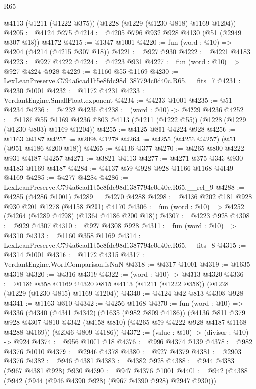 \begin{lexlean}{R65}
\begin{coremodule}
    @4113
    (@1211 (@1222 @375))
    (@1228 (@1229 (@1230 @818) @1169 @1204))
@4205 := @4124 @275
@4214 := @4205 @796 @932 @928 @4130 (@51 (@2949 @307 @18)) @4172
@4215 := @1347 @1001
@4220 := fun (word : @10) => @4204 (@4214 (@4215 @307 @18))
@4221 := @927 @930
@4222 := @4221 @4183
@4223 := @927 @4222
@4224 := @4223 @931
@4227 := fun (word : @10) => @927 @4224 @928
@4229 := @1160 @55 @1169
@4230 := LexLeanPreserve.C794a6cad1b5e8fdc98d1387794c0d40c.R65.__fits_7
@4231 := @4230 @1001
@4232 := @1172 @4231
@4233 := VerdantEngine.SmallFloat.exponent
@4234 := @4233 @1001
@4235 := @51 @4234
@4236 := @4232 @4235
@4238 := (word : @10) -> @4229 @4236
@4252 := @1186
    @55
    @1169
    @4236
    @803
    @4113
    (@1211 (@1222 @55))
    (@1228 (@1229 (@1230 @803) @1169 @1204))
@4255 := @4125 @801 @4224 @928
@4256 := @1163 @4187
@4257 := @2098 @1278
@4264 := @4255 (@4256 @4257) (@51 (@951 @4186 @200 @18))
@4265 := @4136 @377
@4270 := @4265 @800 @4222 @931 @4187 @4257
@4271 := @3821 @4113
@4277 := @4271 @375 @343 @930 @4183 @1169 @4187
@4284 := @4137 @59 @928 @928 @1166 @1168 @4149 @4169
@4285 := @4277 @4284
@4286 := LexLeanPreserve.C794a6cad1b5e8fdc98d1387794c0d40c.R65.__rel_9
@4288 := @4285 (@4286 @1001)
@4289 := @4270 @4288
@4298 := @4136 @202 @181 @928 @930 @201 @1278 (@4158 @201) @4170
@4306 := fun (word : @10) => @4252 (@4264 (@4289 @4298) (@1364 @4186 @200 @18))
@4307 := @4223 @928
@4308 := @929 @4307
@4310 := @927 @4308 @928
@4311 := fun (word : @10) => @4310
@4313 := @1160 @358 @1169
@4314 := LexLeanPreserve.C794a6cad1b5e8fdc98d1387794c0d40c.R65.__fits_8
@4315 := @4314 @1001
@4316 := @1172 @4315
@4317 := VerdantEngine.WordComparison.isNaN
@4318 := @4317 @1001
@4319 := @1635 @4318
@4320 := @4316 @4319
@4322 := (word : @10) -> @4313 @4320
@4336 := @1186
    @358
    @1169
    @4320
    @815
    @4113
    (@1211 (@1222 @358))
    (@1228 (@1229 (@1230 @815) @1169 @1204))
@4340 := @4124 @42 @813 @4308 @928
@4341 := @1163 @810
@4342 := @4256 @1168
@4370 := fun (word : @10) =>
  @4336
    (@4340
      (@4341 @4342)
      (@1635 (@982 @809 @4186))
      (@4136
        @811
        @379
        @928
        @4307
        @810
        @4342
        (@4158 @810)
        (@4265 @59 @4222 @928 @4187 @1168 @4288 @4169))
      (@2046 @809 @4186))
@4372 := (value : @10) -> (divisor : @10) -> @924
@4374 := @956 @1001 @18
@4376 := @996 @4374 @139
@4378 := @982 @4376 @1010
@4379 := @2946 @4378
@4380 := @927 @4379
@4381 := @2903 @4376
@4382 := @946 @4381
@4383 := @4382 @928
@4388 := @944 @4383 (@967 @4381 @928) @930
@4390 := @947 @4376 @1001
@4401 := @942 (@4388 (@942 (@944 (@946 @4390 @928) (@967 @4390 @928) @2947 @930)))

\end{coremodule}
\end{lexlean}
